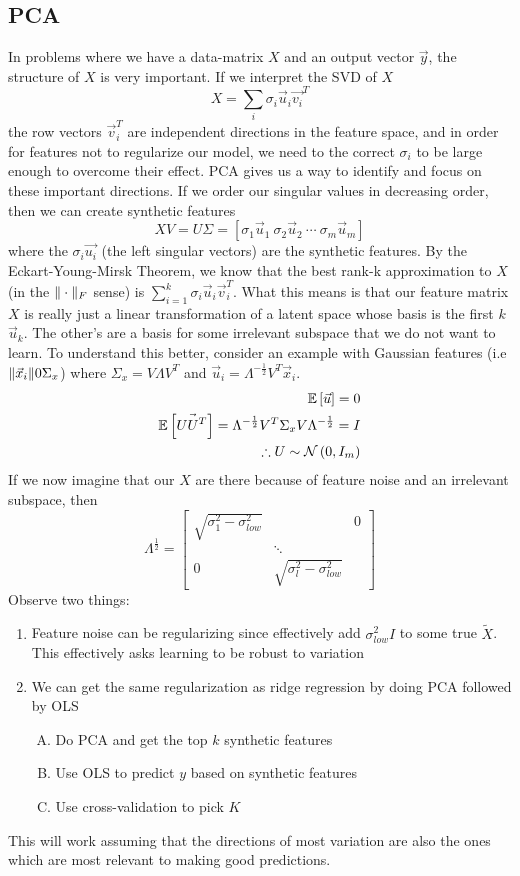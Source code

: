 \subsection{PCA}
In problems where we have a data-matrix $X$ and an output vector $\vec{y}$, the structure of $X$ is very important. If we interpret the SVD of $X$
\[
  X = \sum_i\sigma_i\vec{u}_i\vec{v_i}^T
\]
the row vectors $\vec{v}_i^T$ are independent directions in the feature space, and in order for features not to regularize our model, we need to the correct $\sigma_i$ to be large enough to overcome their effect. PCA gives us a way to identify and focus on these important directions. If we order our singular values in decreasing order, then we can create synthetic features
\[
  XV = U\Sigma = \left[\sigma_1\vec{u}_1 \ \sigma_2\vec{u}_2 \ \cdots \ \sigma_m \vec{u}_m\right]
\]
where the $\sigma_i \vec{u_i}$ (the left singular vectors) are the synthetic features. By the Eckart-Young-Mirsk Theorem, we know that the best rank-k approximation to $X$ (in the $\|\cdot\|_F$ sense) is $\sum_{i=1}^k\sigma_i\vec{u}_i\vec{v}_i^T$. What this means is that our feature matrix $X$ is really just a linear transformation of a latent space whose basis is the first $k$ $\vec{u}_k$. The other's are a basis for some irrelevant subspace that we do not want to learn.
To understand this better, consider an example with Gaussian features (i.e $\|\vec{x}_i\|{0}{\Sigma_x}$) where $\Sigma_x = V\Lambda V^T$ and $\vec{u}_i=\Lambda^{-\frac{1}{2}}V^T\vec{x}_i$.
\begin{align*}
  \mathbb{E}\left[\vec{u}\right] = 0\\
  \mathbb{E}\left[\vec{UU^T}\right] = \Lambda^{-\frac{1}{2}}V^T\Sigma_xV\Lambda^{-\frac{1}{2}} = I\\
  \therefore U\sim\mathcal{N}\left(0, I_m\right)
\end{align*}
If we now imagine that our $X$ are there because of feature noise and an irrelevant subspace, then
\[
  \Lambda^{\frac{1}{2}} = \begin{bmatrix}
    \sqrt{\sigma_1^2-\sigma_{low}^2} & & 0\\
    & \ddots & \\
    0 & \sqrt{\sigma_l^2-\sigma_{low}^2}
  \end{bmatrix}
\]
Observe two things:
\begin{enumerate}
  \item Feature noise can be regularizing since effectively add $\sigma_{low}^2I$ to some true $\tilde{X}$. This effectively asks learning to be robust to variation
  \item We can get the same regularization as ridge regression by doing PCA followed by OLS
    \begin{enumerate}[(A)]
      \item Do PCA and get the top $k$ synthetic features
      \item Use OLS to predict $y$ based on synthetic features
      \item Use cross-validation to pick $K$
    \end{enumerate}
\end{enumerate}
This will work assuming that the directions of most variation are also the ones which are most relevant to making good predictions.
\appendix
